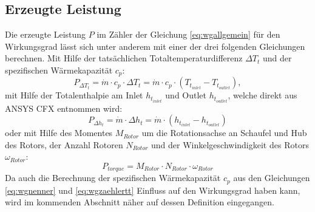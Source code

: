 \subsection{Erzeugte Leistung}
\label{sec:wirkungsgrade}
Die erzeugte Leistung $P$ im Zähler der Gleichung \ref{eq:wgallgemein} für den Wirkungsgrad  lässt sich unter anderem mit einer der drei folgenden Gleichungen berechnen.\newline
Mit Hilfe der tatsächlichen Totaltemperaturdifferenz $\Delta T_t$ und der spezifischen Wärmekapazität $c_p$:
\begin{equation}
\label{eq:wgzaehlertt}
P_{\Delta T_t} = \dot m \cdot c_p \cdot \Delta T_t = \dot m \cdot c_p \cdot \left( T_{t_{inlet}}-T_{t_{outlet}} \right),
\end{equation}
mit Hilfe der Totalenthalpie am Inlet $h_{t_{inlet}}$ und Outlet $h_{t_{outlet}}$, welche direkt aus ANSYS CFX entnommen wird:
\begin{equation}
\label{eq:wgzaehlerht}
P_{\Delta h_t} = \dot m \cdot \Delta h_t = \dot m \cdot \left( h_{t_{inlet}}-h_{t_{outlet}} \right)
\end{equation}
oder mit Hilfe des Momentes $M_{Rotor}$ um die Rotationsachse an Schaufel und Hub des Rotors, der Anzahl Rotoren $N_{Rotor}$ und der Winkelgeschwindigkeit des Rotors $\omega_{Rotor}$:
\begin{equation}
\label{eq:wgzaehlertorque}
P_{torque} = M_{Rotor} \cdot N_{Rotor} \cdot \omega_{Rotor}
\end{equation}
Da auch die Berechnung der spezifischen Wärmekapazität $c_p$ aus den Gleichungen \ref{eq:wgnenner} und \ref{eq:wgzaehlertt} Einfluss auf den Wirkungsgrad haben kann, wird im kommenden Abschnitt näher auf dessen Definition eingegangen.

